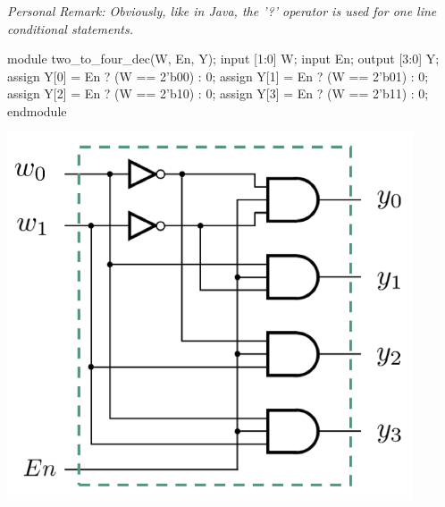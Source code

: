 \documentclass[12pt,openany]{book}
\begin{document}
\textit{Personal Remark: Obviously, like in Java, the '?' operator is used for one line conditional statements.}
\vspace*{10px}
\newline
\begin{minipage}[htp]{0.45\textwidth}	
	\begin{vhdl}
module two_to_four_dec(W, En, Y);
	input [1:0] W;
	input En;
	output [3:0] Y;
	assign Y[0] = En ? (W == 2'b00) : 0;
	assign Y[1] = En ? (W == 2'b01) : 0;
	assign Y[2] = En ? (W == 2'b10) : 0;
	assign Y[3] = En ? (W == 2'b11) : 0;
endmodule
	\end{vhdl}
\end{minipage}
\hfill
\vline
\hfill
\begin{minipage}[htp]{0.45\textwidth}
    \begin{center}
        \includegraphics[width=0.9\textwidth]{circuits/16.1_4.png}
    \end{center}
\end{minipage}
\end{document}
